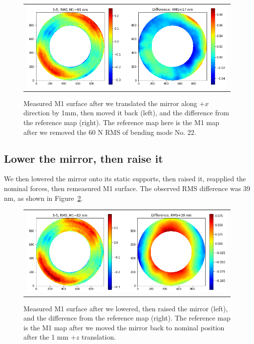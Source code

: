 \documentclass [twoside,openbib,12pt]{article}
\begin{document}
 \begin{figure}[bthp]
   \begin{center}
   \begin{tabular}{c}
\includegraphics[width=120mm]{figures/repeatX.png}
  \end{tabular}
   \end{center}
   \caption
  { \label{fig:repeatX}
Measured M1 surface after we translated the mirror along $+x$
direction by 1mm, then moved it back (left), and the difference from the reference map
(right). The reference map here is the M1 map after we removed the 60
N RMS of bending mode No. 22.
 }
\end{figure}


\subsection{Lower the mirror, then raise it}

We then lowered the mirror onto its static supports, then raised it,
reapplied the nominal forces,
then remeasured M1 surface.
The observed RMS difference was 39 nm, as shown in Figure~\ref{fig:lowerRaise}.

 \begin{figure}[bthp]
   \begin{center}
   \begin{tabular}{c}
\includegraphics[width=120mm]{figures/lowerRaise.png}
  \end{tabular}
   \end{center}
   \caption
  { \label{fig:lowerRaise}
Measured M1 surface after we lowered, then raised the mirror (left), and the difference from the reference map
(right). The reference map is the M1 map after we moved the mirror
back to nominal position after the 1 mm $+z$ translation.
 }
\end{figure}
\end{document}

